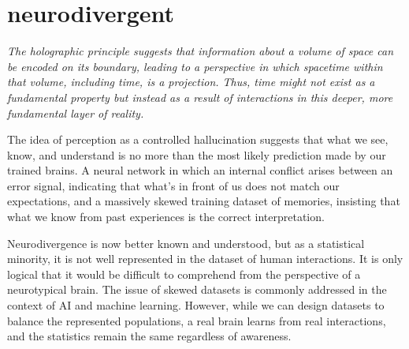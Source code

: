 \chapter*{neurodivergent}
\begin{center}
\vspace{2cm}
\begin{flushright}
\large
\textit{The holographic principle suggests that information about a volume of space can be encoded on its boundary, leading to a perspective in which spacetime within that volume, including time, is a projection. Thus, time might not exist as a fundamental property but instead as a result of interactions in this deeper, more fundamental layer of reality.}
\end{flushright}
\vspace{2cm}
\end{center}
\normalsize

\newpage  %
The idea of perception as a controlled hallucination suggests that what we see, know, and understand is no more than the most likely prediction made by our trained brains. A neural network in which an internal conflict arises between an error signal, indicating that what's in front of us does not match our expectations, and a massively skewed training dataset of memories, insisting that what we know from past experiences is the correct interpretation.

Neurodivergence is now better known and understood, but as a statistical minority, it is not well represented in the dataset of human interactions. It is only logical that it would be difficult to comprehend from the perspective of a neurotypical brain. The issue of skewed datasets is commonly addressed in the context of AI and machine learning. However, while we can design datasets to balance the represented populations, a real brain learns from real interactions, and the statistics remain the same regardless of awareness.


